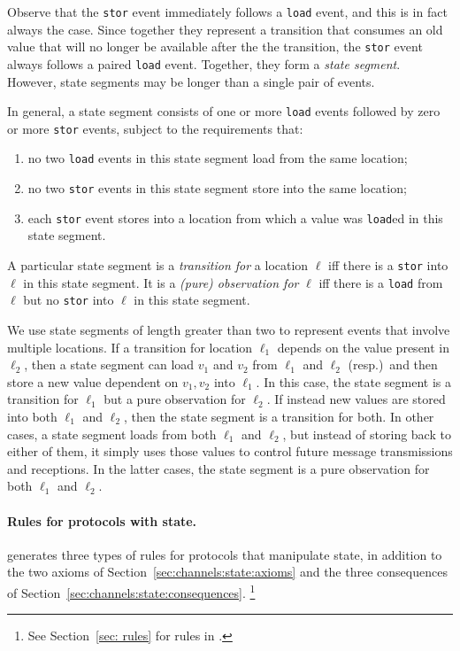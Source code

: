 Observe that the \verb|stor| event immediately follows a \verb|load|
event, and this is in fact always the case.  Since together they
represent a transition that consumes an old value that will no longer
be available after the the transition, the \verb|stor| event always
follows a paired \verb|load| event.  Together, they form a \emph{state
  segment}.  However, state segments may be longer than a single pair
of events.

In general, a state segment consists of one or more \verb|load|
events followed by zero or more \verb|stor| events, subject to the
requirements that:
%
\begin{enumerate}
  \item no two \verb|load| events in this state segment load from the
  same location;
  \item no two \verb|stor| events in this state segment store into the
  same location;
  \item each \verb|stor| event stores into a location from which a
  value was \verb|load|ed in this state segment.
\end{enumerate}
%
A particular state segment is a \emph{transition for} a location
$\ell$ iff there is a \verb|stor| into $\ell$ in this state segment.
It is a \emph{(pure) observation for} $\ell$ iff there is a
\verb|load| from $\ell$ but no \verb|stor| into $\ell$ in this state
segment.

We use state segments of length greater than two to represent events
that involve multiple locations.  If a transition for location
$\ell_1$ depends on the value present in $\ell_2$, then a state
segment can load $v_1$ and $v_2$ from $\ell_1$ and $\ell_2$
(resp.)~and then store a new value dependent on $v_1,v_2$ into
$\ell_1$.  In this case, the state segment is a transition for
$\ell_1$ but a pure observation for $\ell_2$.  If instead new values
are stored into both $\ell_1$ and $\ell_2$, then the state segment is
a transition for both.  In other cases, a state segment loads from
both $\ell_1$ and $\ell_2$, but instead of storing back to either of
them, it simply uses those values to control future message
transmissions and receptions.  In the latter cases, the state segment
is a pure observation for both $\ell_1$ and $\ell_2$.  

\paragraph{Rules for protocols with
  state.}  \label{state:gen:rules:start} {\cpsa} generates three types
of rules for protocols that manipulate state, in addition to the two
axioms of Section~\ref{sec:channels:state:axioms} and the three
consequences of Section~\ref{sec:channels:state:consequences}.%
%
\footnote{See Section~\ref{sec: rules} for rules in {\cpsa}.}

